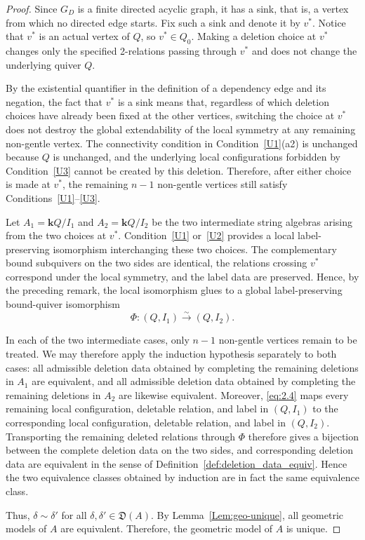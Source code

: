 \documentclass[11pt]{amsart}
\numberwithin{equation}{section}
\theoremstyle{definition}
\begin{document}
\begin{proof}
Since $G_D$ is a finite directed acyclic graph, it has a sink,
that is, a vertex from which no directed edge starts. Fix such a
sink and denote it by $v^*$. Notice that $v^*$ is an actual vertex
of $Q$, so $v^*\in Q_0$. Making a deletion choice at $v^*$ changes
only the specified 2-relations passing through $v^*$ and
does not change the underlying quiver $Q$.

By the existential quantifier in the definition of a dependency
edge and its negation, the fact that $v^*$ is a sink means that,
regardless of which deletion choices have already been fixed at
the other vertices, switching the choice at $v^*$ does not destroy
the global extendability of the local symmetry at any remaining
non-gentle vertex. The connectivity condition in
Condition~\ref{U1}\textup{(a2)} is unchanged because $Q$ is
unchanged, and the underlying local configurations forbidden by
Condition~\ref{U3} cannot be created by this deletion. Therefore,
after either choice is made at $v^*$, the remaining $n-1$
non-gentle vertices still satisfy
Conditions~\ref{U1}--\ref{U3}.

Let $A_1=\mathbf{k}Q/I_1$ and $A_2=\mathbf{k}Q/I_2$
be the two intermediate string algebras arising from the two
choices at $v^*$. Condition~\ref{U1} or~\ref{U2} provides a local
label-preserving isomorphism interchanging these two choices. The
complementary bound subquivers on the two sides are identical, the
 relations crossing $v^*$ correspond under the local
symmetry, and the label data are preserved. Hence, by the
preceding remark, the local isomorphism glues to a global
label-preserving bound-quiver isomorphism
\begin{equation}\label{eq:2.4}
\Phi:(Q,I_1)\xrightarrow{\sim}(Q,I_2).
\end{equation}

In each of the two intermediate cases, only $n-1$ non-gentle
vertices remain to be treated. We may therefore apply the
induction hypothesis separately to both cases: all admissible
deletion data obtained by completing the remaining deletions in
$A_1$ are equivalent, and all admissible deletion data obtained by
completing the remaining deletions in $A_2$ are likewise
equivalent. Moreover, \eqref{eq:2.4} maps every remaining local
configuration, deletable relation, and label in $(Q,I_1)$ to the
corresponding local configuration, deletable relation, and label
in $(Q,I_2)$. Transporting the remaining deleted relations through
$\Phi$ therefore gives a bijection between the complete deletion
data on the two sides, and corresponding deletion data are
equivalent in the sense of
Definition~\ref{def:deletion_data_equiv}. Hence the two equivalence
classes obtained by induction are in fact the same equivalence
class.

Thus, $\delta\sim\delta'$ for all
$\delta,\delta'\in\mathfrak D(A)$. By
Lemma~\ref{Lem:geo-unique}, all
geometric models of $A$ are equivalent. Therefore, the geometric
model of $A$ is unique.
\end{proof}
\end{document}
